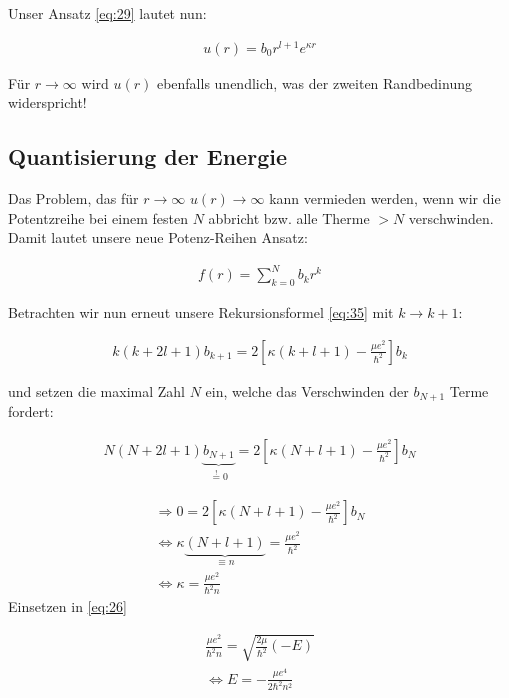 Unser Ansatz \eqref{eq:29} lautet nun:

\begin{align}
  \label{eq:39}
    u(r) = b_0 r^{l+1} e^{\kappa r}
\end{align}

Für \(r\to\infty\) wird \(u(r)\) ebenfalls unendlich, was der zweiten Randbedinung widerspricht! 


\subsection{Quantisierung der Energie}

Das Problem, das für \(r\to\infty\) \(u(r)\to\infty\)  kann vermieden werden, wenn wir die Potentzreihe bei einem festen \(N\) abbricht bzw. alle Therme \(>N\) verschwinden. Damit lautet unsere neue Potenz-Reihen Ansatz:

\begin{align}
  \label{eq:40}
 f(r) = \sum^{N}_{k=0} b_kr^k
\end{align}

Betrachten wir nun erneut unsere Rekursionsformel \eqref{eq:35} mit \(k\to k+1\):

\begin{align}
  \label{eq:41}
      k(k+2l+1)b_{k+1} = 2\left[ \kappa(k+l+1)-\frac{\mu e^2}{\hbar^2}\right] b_{k}
\end{align}

und setzen die maximal Zahl \(N\) ein, welche das Verschwinden der \(b_{N+1}\) Terme fordert:

\begin{align}
  \label{eq:42}
    N(N+2l+1)\underbrace{b_{N+1}}_{\stackrel{!}=0} = 2\left[ \kappa(N+l+1)-\frac{\mu e^2}{\hbar^2}\right] b_{N} 
\end{align}

\begin{align}
  \Rightarrow 0 = 2\left[ \kappa(N+l+1)-\frac{\mu e^2}{\hbar^2}\right] b_{N} \\
\Leftrightarrow  \kappa \underbrace{(N+l+1)}_{\equiv n} = \frac{\mu e^2}{\hbar^2}\\
\Leftrightarrow  \kappa= \frac{\mu e^2}{\hbar^2 n}\label{eq:43}
\end{align}
Einsetzen in \eqref{eq:26}

\begin{align}
  \label{eq:44}
  \frac{\mu e^2}{\hbar^2 n} = \sqrt{\frac{2\mu}{\hbar^2}(-E)} \\
\Leftrightarrow  E =  - \frac{\mu e^4}{2\hbar^2 n^2} 
\end{align}

